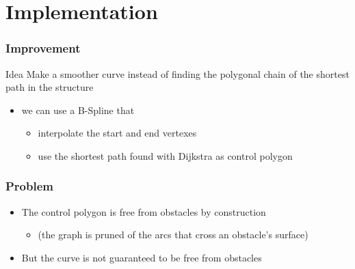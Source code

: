 
\section{Implementation}

\begin{frame}
  \frametitle{Improvement}
  \begin{block}{Idea}
    Make a \alert{smoother} curve instead of finding the polygonal chain
    of the shortest path in the structure
  \end{block}
  \pause
  \begin{itemize}
  \item we can use a \alert{B-Spline} that \pause
    \begin{itemize}
    \item \alert{interpolate} the start and end vertexes\pause
    \item use the shortest path found with
      Dijkstra as \alert{control polygon}
    \end{itemize}
  \end{itemize}
\end{frame}

\begin{frame}
  \frametitle{Problem}  
  \begin{itemize}
  \item The control polygon is free from obstacles by
    construction\pause
    \begin{itemize}
    \item (the graph is pruned of the arcs that cross an obstacle's surface)\pause
    \end{itemize}
  \item But the curve is not guaranteed to be free from obstacles\pause
  \end{itemize}
  \begin{center}
  \end{center}
\end{frame}

